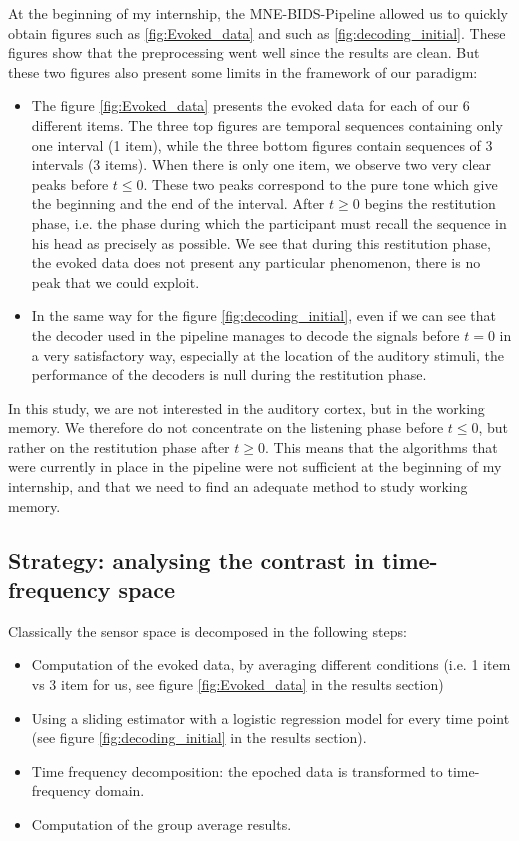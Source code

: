 At the beginning of my internship, the MNE-BIDS-Pipeline allowed us to quickly obtain figures such as \ref{fig:Evoked_data} and such as \ref{fig:decoding_initial}. These figures show that the preprocessing went well since the results are clean. But these two figures also present some limits in the framework of our paradigm:

\begin{itemize}
    \item The figure \ref{fig:Evoked_data} presents the evoked data for each of our 6 different items. The three top figures are temporal sequences containing only one interval (1 item), while the three bottom figures contain sequences of 3 intervals (3 items).
    When there is only one item, we observe two very clear peaks before $t \leq 0$. These two peaks correspond to the pure tone which give the beginning and the end of the interval. After $t \geq 0$ begins the restitution phase, i.e. the phase during which the participant must recall the sequence in his head as precisely as possible. We see that during this restitution phase, the evoked data does not present any particular phenomenon, there is no peak that we could exploit.
    \item In the same way for the figure \ref{fig:decoding_initial}, even if we can see that the decoder used in the pipeline manages to decode the signals before $t=0$ in a very satisfactory way, especially at the location of the auditory stimuli, the performance of the decoders is null during the restitution phase.
\end{itemize}

In this study, we are not interested in the auditory cortex, but in the working memory. We therefore do not concentrate on the listening phase before $t \leq 0$, but rather on the restitution phase after $t \geq 0$. This means that the algorithms that were currently in place in the pipeline were not sufficient at the beginning of my internship, and that we need to find an adequate method to study working memory.

\subsection{Strategy: analysing the contrast in time-frequency space}

Classically the sensor space is decomposed in the following steps:
\begin{itemize}
    \item Computation of the evoked data, by averaging different conditions (i.e. 1 item vs 3 item for us, see figure \ref{fig:Evoked_data} in the results section)
    \item Using a sliding estimator with a logistic regression model for every time point (see figure \ref{fig:decoding_initial} in the results section).
    \item Time frequency decomposition: the epoched data is transformed to time-frequency domain.
    \item Computation of the group average results.
\end{itemize}

